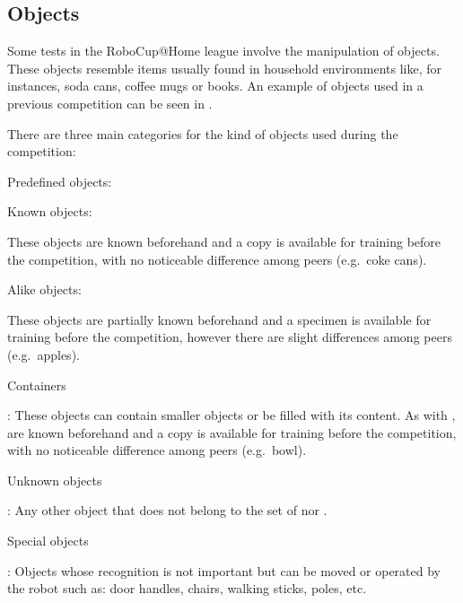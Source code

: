 \def\NumObjects{10\ }
\def\NumLocations{20\ }
\def\NumNames{20\ }

%
%
%

\subsection{Objects}
\label{rule:scenario_objects}
Some tests in the RoboCup@Home league involve the manipulation of objects. These objects resemble items usually found in household environments like, for instances, soda cans, coffee mugs or books. An example of objects used in a previous competition can be seen in .

There are three main categories for the kind of objects used during the competition:

\begin{enumerate}
	{\bf\item Predefined objects:} 
	\begin{enumerate}
		{\bf\item Known objects:} These objects are known beforehand and a copy is available for training before the competition, with no noticeable difference among peers (e.g.~coke cans).

		{\bf\item Alike objects:} These objects are partially known beforehand and a specimen is available for training before the competition, however there are slight differences among peers (e.g.~apples).

	\end{enumerate}

	{\bf\item Containers}: These objects can contain smaller objects or be filled with its content. As with , are known beforehand and a copy is available for training before the competition, with no noticeable difference among peers (e.g.~bowl).

	{\bf\item Unknown objects}: Any other object that does not belong to the set of  nor .

	{\bf\item Special objects}: Objects whose recognition is not important but can be moved or operated by the robot such as: door handles, chairs, walking sticks, poles, etc.

\end{enumerate}


